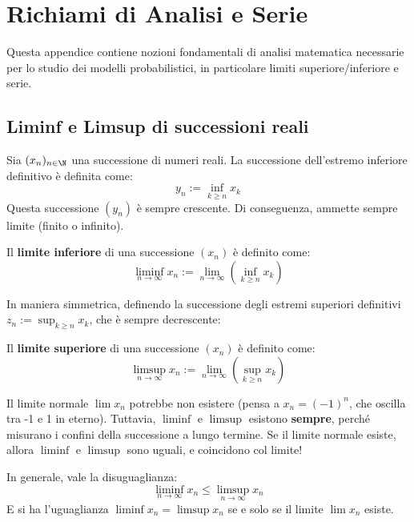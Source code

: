 
\appendix
\chapter{Richiami di Analisi e Serie}

Questa appendice contiene nozioni fondamentali di analisi matematica necessarie per lo studio dei modelli probabilistici, in particolare limiti superiore/inferiore e serie.

\section{Liminf e Limsup di successioni reali}

Sia $(x_n)_{n \in \N}$ una successione di numeri reali. 
La successione dell'estremo inferiore definitivo è definita come:
\[ y_n := \inf_{k \ge n} x_k \]
Questa successione $(y_n)$ è sempre crescente. Di conseguenza, ammette sempre limite (finito o infinito).

\begin{definition}
Il \textbf{limite inferiore} di una successione $(x_n)$ è definito come:
\[ \liminf_{n \to \infty} x_n := \lim_{n \to \infty} \left( \inf_{k \ge n} x_k \right) \]
\end{definition}

In maniera simmetrica, definendo la successione degli estremi superiori definitivi $z_n := \sup_{k \ge n} x_k$, che è sempre decrescente:

\begin{definition}
Il \textbf{limite superiore} di una successione $(x_n)$ è definito come:
\[ \limsup_{n \to \infty} x_n := \lim_{n \to \infty} \left( \sup_{k \ge n} x_k \right) \]
\end{definition}

\begin{spiegazione}
Il limite normale $\lim x_n$ potrebbe non esistere (pensa a $x_n = (-1)^n$, che oscilla tra -1 e 1 in eterno). Tuttavia, $\liminf$ e $\limsup$ esistono \textbf{sempre}, perché misurano i confini della successione a lungo termine. 
Se il limite normale esiste, allora $\liminf$ e $\limsup$ sono uguali, e coincidono col limite!
\end{spiegazione}

In generale, vale la disuguaglianza:
\[ \liminf_{n \to \infty} x_n \le \limsup_{n \to \infty} x_n \]
E si ha l'uguaglianza $\liminf x_n = \limsup x_n$ se e solo se il limite $\lim x_n$ esiste.

